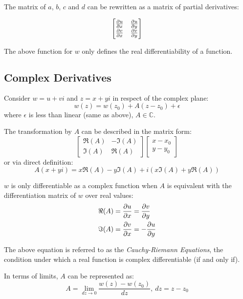 \documentclass[12pt]{article}
\begin{document}
	The matrix of $a$, $b$, $c$ and $d$ can be rewritten as a matrix of partial derivatives:
	
	\begin{equation*}
		\begin{bmatrix}
			\frac{\partial u}{\partial x} & \frac{\partial u}{\partial y} \\
			\frac{\partial v}{\partial x} & \frac{\partial v}{\partial y}
		\end{bmatrix}
	\end{equation*}
	
	The above function for $w$ only defines the real differentiability of a function.
	
	\subsection{Complex Derivatives}
	
	Consider $w = u + vi$ and $z = x + yi$ in respect of the complex plane: $$w(z) = w(z_0) + A(z - z_0) + \epsilon$$
	where $\epsilon$ is less than linear (same as above), $A \in \mathbb{C}$.
	
	The transformation by $A$ can be described in the matrix form:
	\begin{equation*}
		\begin{bmatrix}
			\Re(A) & -\Im(A) \\ \Im(A) & \Re(A)
		\end{bmatrix}
		\begin{bmatrix}
			x - x_0 \\ y - y_0
		\end{bmatrix}
	\end{equation*}
	or via direct definition: $$A(x + yi) = x\Re(A) - y\Im(A) + i(x\Im(A) +y\Re(A))$$
	
	$w$ is only differentiable as a complex function when $A$ is equivalent with the differentiation matrix of $w$ over real values:
	\begin{align*}
		\Re(A) &= \frac{\partial u}{\partial x} = \frac{\partial v}{\partial y} \\
		\Im(A) &= \frac{\partial v}{\partial x} = -\frac{\partial u}{\partial y}
	\end{align*}
	
	The above equation is referred to as the \textit{Cauchy-Riemann Equations}, the condition under which a real function is complex differentiable (if and only if).
	
	In terms of limits, $A$ can be represented as: $$A = \lim_{dz \to 0} \frac{w(z) - w(z_0)}{dz},\ dz = z-z_0$$
	
	
	
	
\end{document}
